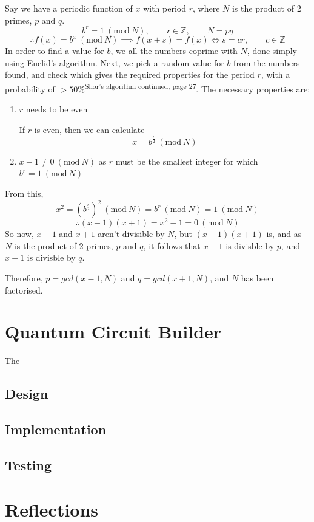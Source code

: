 \documentclass[a4paper,10pt, titlepage, twoside]{article}
\newcommand{\Mod}[1]{\ (\mathrm{mod}\ #1)}
\begin{document}
Say we have a periodic function of $x$ with period $r$, where $N$ is the product of 2 primes, $p$ and $q$.
$$b^r = 1 \Mod N, \qquad r \in \mathbb{Z}, \qquad N = pq$$
$$\therefore f(x) = b^x \Mod N \implies f(x+s) = f(x) \Leftrightarrow s = cr, \qquad c \in \mathbb{Z} $$
In order to find a value for $b$, we all the numbers coprime with $N$, done simply using Euclid's algorithm. Next, we pick a random value for $b$ from the numbers found, and check which gives the required properties for the period $r$, with a probability of $>50\%$\cite{nsc}\textsuperscript{Shor's algorithm continued, page 27}. The necessary properties are:\par
\begin{enumerate}
    \item $r$ needs to be even\par
    If $r$ is even, then we can calculate
    $$x = b^{\frac{r}{2}}\Mod N$$
    \item $x-1 \neq 0 \Mod N$ as $r$ must be the smallest integer for which $b^r = 1 \Mod N$
\end{enumerate}
From this,
$$ x^2 = (b^{\frac{r}{2}})^2 \Mod N = b^r \Mod N = 1 \Mod N$$
$$\therefore (x-1)(x+1) = x^2 - 1 = 0 \Mod N$$
So now, $x-1$ and $x+1$ aren't divisible by $N$, but $(x-1)(x+1)$ is, and as $N$ is the product of 2 primes, $p$ and $q$, it follows that $x-1$ is divisble by $p$, and $x+1$ is divisble by $q$.\par
Therefore, $p = gcd(x-1, N)$ and $q = gcd(x+1, N)$, and $N$ has been factorised.

\section{Quantum Circuit Builder}
The 

\subsection{Design}

\subsection{Implementation}

\subsection{Testing}


\section{Reflections}

\newpage


\end{document}
